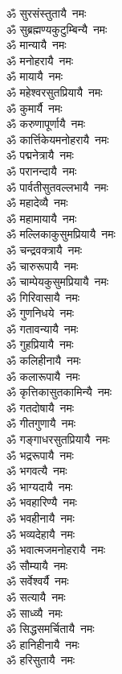 \begin{flushleft}
\begin{multicols}{2}
ॐ सुरसंस्तुतायै~नमः\hfill{}\\
ॐ सुब्रह्मण्यकुटुम्बिन्यै~नमः\\
ॐ मान्यायै~नमः\\
ॐ मनोहरायै~नमः\\
ॐ मायायै~नमः\\
ॐ महेश्वरसुतप्रियायै~नमः\\
ॐ कुमार्यै~नमः\\
ॐ करुणापूर्णायै~नमः\\
ॐ कार्त्तिकेयमनोहरायै~नमः\\
ॐ पद्मनेत्रायै~नमः\\
ॐ परानन्दायै~नमः\hfill{}\\
ॐ पार्वतीसुतवल्लभायै~नमः\\
ॐ महादेव्यै~नमः\\
ॐ महामायायै~नमः\\
ॐ मल्लिकाकुसुमप्रियायै~नमः\\
ॐ चन्द्रवक्त्रायै~नमः\\
ॐ चारुरूपायै~नमः\\
ॐ चाम्पेयकुसुमप्रियायै~नमः\\
ॐ गिरिवासायै~नमः\\
ॐ गुणनिधये~नमः\\
ॐ गतावन्यायै~नमः\hfill{}\\
ॐ गुहप्रियायै~नमः\\
ॐ कलिहीनायै~नमः\\
ॐ कलारूपायै~नमः\\
ॐ कृत्तिकासुतकामिन्यै~नमः\\
ॐ गतदोषायै~नमः\\
ॐ गीतगुणायै~नमः\\
ॐ गङ्गाधरसुतप्रियायै~नमः\\
ॐ भद्ररूपायै~नमः\\
ॐ भगवत्यै~नमः\\
ॐ भाग्यदायै~नमः\hfill{}\\
ॐ भवहारिण्यै~नमः\\
ॐ भवहीनायै~नमः\\
ॐ भव्यदेहायै~नमः\\
ॐ भवात्मजमनोहरायै~नमः\\
ॐ सौम्यायै~नमः\\
ॐ सर्वेश्वर्यै~नमः\\
ॐ सत्यायै~नमः\\
ॐ साध्व्यै~नमः\\
ॐ सिद्धसमर्चितायै~नमः\\
ॐ हानिहीनायै~नमः\hfill{}\\
ॐ हरिसुतायै~नमः\\

\end{multicols}
\end{flushleft}

